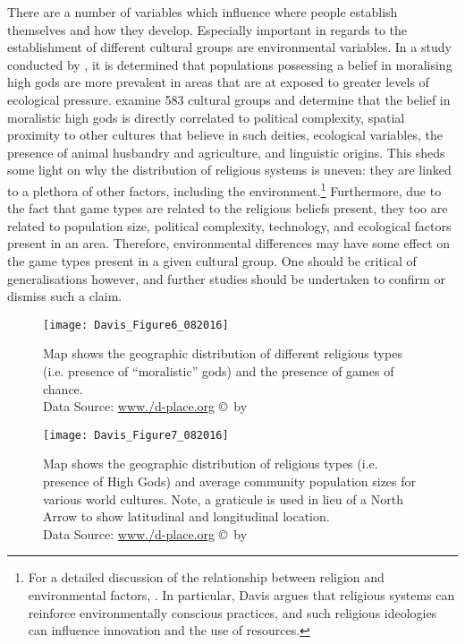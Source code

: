 There are a number of variables which influence where people establish themselves and how they develop. Especially important in regards to the establishment of different cultural groups are environmental variables. In a study conducted by \textcite{botero2014}, it is determined that populations possessing a belief in moralising high gods are more prevalent in areas that are at exposed to greater levels of ecological pressure. \textcite[16786]{botero2014} examine 583 cultural groups and determine that the belief in moralistic high gods is directly correlated to political complexity, spatial proximity to other cultures that believe in such deities, ecological variables, the presence of animal husbandry and agriculture, and linguistic origins. This sheds some light on why the distribution of religious systems is uneven: they are linked to a plethora of other factors, including the environment.\footnote{For a detailed discussion of the relationship between religion and environmental factors, \textcite{davis}. In particular, Davis argues that religious systems can reinforce environmentally conscious practices, and such religious ideologies can influence innovation and the use of resources.} Furthermore, due to the fact that game types are related to the religious beliefs present, they too are related to population size, political complexity, technology, and ecological factors present in an area. Therefore, environmental differences may have some effect on the game types present in a given cultural group. One should be critical of generalisations however, and further studies should be undertaken to confirm or dismiss such a claim.

\begin{figure}[!htb] %
	\texttt{[image: Davis\_Figure6\_082016]}
	\caption{Map shows the geographic distribution of different religious types (i.e. presence of \enquote{moralistic} gods) and the presence of games of chance.
	{\normalfont\scriptsize \\ Data Source: \href{http:/www./d-place.org}{www./d-place.org} \copyright\ by 
                 \shortauthor
                  }}
	\label{fig:Figure6_Davis_082016}
\end{figure}

\begin{figure}[!htb] %
	\texttt{[image: Davis\_Figure7\_082016]}
	\caption{Map shows the geographic distribution of religious types (i.e. presence of High Gods) and average community population sizes for various world cultures. Note, a graticule is used in lieu of a North Arrow to show latitudinal and longitudinal location.
	{\normalfont\scriptsize \\ Data Source: \href{http:/www./d-place.org}{www./d-place.org} \copyright\ by 
                 \shortauthor
                  }}
	\label{fig:Figure7_Davis_082016}
\end{figure}

